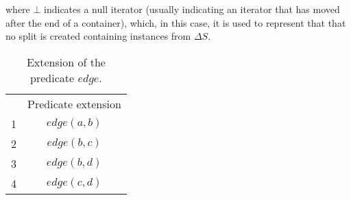 \documentclass[preprint]{tlp}
\newcommand{\DNF}{\ensuremath{\Delta S}\xspace}
\begin{document}
\noindent where $\bot$ indicates a null iterator 
(usually indicating an iterator that has moved after the end of a container), which, in this case, it is used to represent that  that no split is created containing instances from $\DNF$.

\begin{table}[t!]
 \begin{tabular}{|c|c|}
  \cline{1-2}
  & Predicate extension \\
  \cline{1-2}
    1 & $edge(a,b)$ \\
    2 & $edge(b,c)$ \\
  \cline{1-2}
    3 & $edge(b,d)$ \\
    4 & $edge(c,d)$ \\
  \cline{1-2}
 \end{tabular}
\caption{Extension of the predicate $edge$.}
\label{ext_2}
\end{table}






\clearpage{}  
\end{document}
